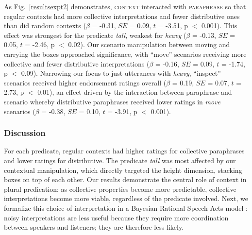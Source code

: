 \documentclass[linguex]{sp}
\begin{document}
As Fig.~\ref{resultsexpt2} demonstrates, \textsc{context} interacted with \textsc{paraphrase} so that regular contexts had more collective interpretations and fewer distributive ones than did random contexts ($\beta$ = -0.31, $SE$ = 0.09, $t$ = -3.51, p $<$ 0.001). This effect was strongest for the predicate \emph{tall}, weakest for \emph{heavy} ($\beta$ = -0.13, $SE$ = 0.05, $t$ = -2.46, p $<$ 0.02). Our scenario manipulation between moving and carrying the boxes approached significance, with ``move'' scenarios receiving more collective and fewer distributive interpretations ($\beta$ = -0.16, $SE$ = 0.09, $t$ = -1.74, p $<$ 0.09). Narrowing our focus to just utterances with \emph{heavy}, ``inspect'' scenarios received higher endorsement ratings overall ($\beta$ = 0.19, $SE$ = 0.07, $t$ = 2.73, p $<$ 0.01), an effect driven by the interaction between paraphrase and scenario whereby distributive paraphrases received lower ratings in \emph{move} scenarios ($\beta$ = -0.38, $SE$ = 0.10, $t$ = -3.91, p $<$ 0.001).


\subsubsection{Discussion}

For each predicate, regular contexts had higher ratings for collective paraphrases and lower ratings for distributive. The predicate \textit{tall} was most affected by our contextual manipulation, which directly targeted the height dimension, stacking boxes on top of each other. Our results demonstrate the central role of context in plural predication: as collective properties become more predictable, collective interpretations become more viable, regardless of the predicate involved. Next, we formalize this choice of interpretation in a Bayesian Rational Speech Acts model \citep{frankgoodman2012,lassitergoodman2013}: noisy interpretations are less useful because they require more coordination between speakers and listeners; they are therefore less likely.
\end{document}
